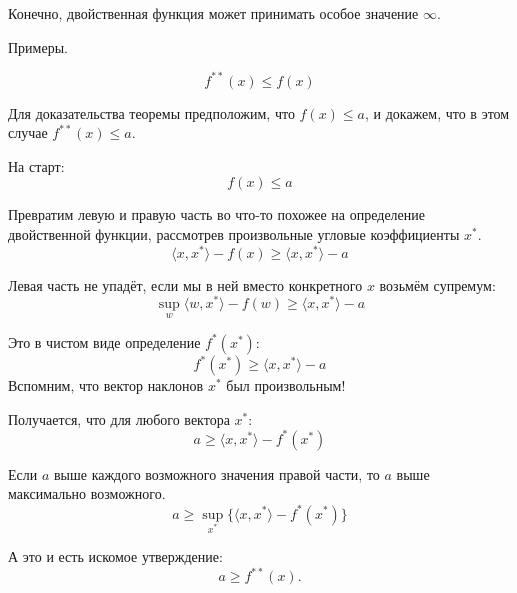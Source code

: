 \documentclass[
  letterpaper,
  DIV=11,
  numbers=noendperiod]{scrartcl}
\begin{document}
Конечно, двойственная функция может принимать особое значение
\(\infty\).

Примеры.

\begin{tcolorbox}[enhanced jigsaw, breakable, opacityback=0, title=\textcolor{quarto-callout-note-color}{\faInfo}\hspace{0.5em}{Теоремка}, opacitybacktitle=0.6, toptitle=1mm, bottomtitle=1mm, colframe=quarto-callout-note-color-frame, leftrule=.75mm, colback=white, titlerule=0mm, rightrule=.15mm, arc=.35mm, coltitle=black, colbacktitle=quarto-callout-note-color!10!white, toprule=.15mm, bottomrule=.15mm, left=2mm]

\[
f^{**}(x) \leq f(x)
\]

\end{tcolorbox}

\begin{tcolorbox}[enhanced jigsaw, breakable, opacityback=0, title=\textcolor{quarto-callout-warning-color}{\faExclamationTriangle}\hspace{0.5em}{Доказательство неравенства}, opacitybacktitle=0.6, toptitle=1mm, bottomtitle=1mm, colframe=quarto-callout-warning-color-frame, leftrule=.75mm, colback=white, titlerule=0mm, rightrule=.15mm, arc=.35mm, coltitle=black, colbacktitle=quarto-callout-warning-color!10!white, toprule=.15mm, bottomrule=.15mm, left=2mm]

Для доказательства теоремы предположим, что \(f(x) \leq a\), и докажем,
что в этом случае \(f^{**}(x) \leq a\).

На старт: \[
f(x) \leq a
\]

Превратим левую и правую часть во что-то похожее на определение
двойственной функции, рассмотрев произвольные угловые коэффициенты
\(x^*\). \[
\langle x, x^* \rangle - f(x) \geq \langle x, x^* \rangle - a
\]

Левая часть не упадёт, если мы в ней вместо конкретного \(x\) возьмём
супремум: \[
\sup_{w}\langle w, x^* \rangle - f(w) \geq \langle x, x^* \rangle - a
\]

Это в чистом виде определение \(f^*(x^*)\): \[
f^*(x^*) \geq \langle x, x^* \rangle - a
\] Вспомним, что вектор наклонов \(x^*\) был произвольным!

Получается, что для любого вектора \(x^*\): \[
a \geq \langle x, x^* \rangle - f^*(x^*)
\]

Если \(a\) выше каждого возможного значения правой части, то \(a\) выше
максимально возможного. \[
a \geq \sup_{x^*}\{\langle x, x^* \rangle - f^*(x^*)\}
\]

А это и есть искомое утверждение: \[
a \geq f^{**}(x).
\]

\end{tcolorbox}
\end{document}
